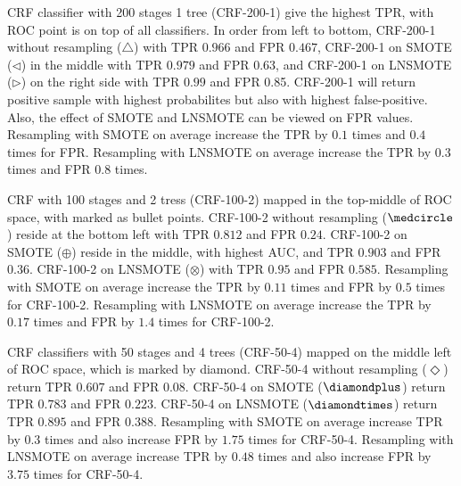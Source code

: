 CRF classifier with 200 stages 1 tree (CRF-200-1) give the highest TPR, with
ROC point is on top of all classifiers.
In order from left to bottom, CRF-200-1 without resampling ($\triangle$) with
TPR $0.966$ and FPR $0.467$, CRF-200-1 on SMOTE ($\triangleleft$) in the middle
with TPR $0.979$ and FPR $0.63$, and CRF-200-1 on LNSMOTE ($\triangleright$) on
the right side with TPR $0.99$ and FPR 0.85.
CRF-200-1 will return positive sample with highest probabilites but also with
highest false-positive.
Also, the effect of SMOTE and LNSMOTE can be viewed on FPR values.
Resampling with SMOTE on average increase the TPR by $0.1$ times and $0.4$
times for FPR.
Resampling with LNSMOTE on average increase the TPR by $0.3$ times and FPR
$0.8$ times.

CRF with 100 stages and 2 tress (CRF-100-2) mapped in the top-middle of ROC
space, with marked as bullet points.
CRF-100-2 without resampling ($\medcircle$) reside at the bottom left with TPR
$0.812$ and FPR $0.24$.
CRF-100-2 on SMOTE ($\oplus$) reside in the middle, with highest AUC, and TPR
$0.903$ and FPR $0.36$.
CRF-100-2 on LNSMOTE ($\otimes$) with TPR $0.95$ and FPR $0.585$.
Resampling with SMOTE on average increase the TPR by $0.11$ times and FPR by
$0.5$ times for CRF-100-2.
Resampling with LNSMOTE on average increase the TPR by $0.17$ times and FPR by
$1.4$ times for CRF-100-2.

CRF classifiers with 50 stages and 4 trees (CRF-50-4) mapped on the middle left
of ROC space, which is marked by diamond.
CRF-50-4 without resampling ($\Diamond$) return TPR $0.607$ and FPR $0.08$.
CRF-50-4 on SMOTE ($\diamondplus$) return TPR $0.783$ and FPR $0.223$.
CRF-50-4 on LNSMOTE ($\diamondtimes$) return TPR $0.895$ and FPR $0.388$.
Resampling with SMOTE on average increase TPR by $0.3$ times and also increase
FPR by $1.75$ times for CRF-50-4.
Resampling with LNSMOTE on average increase TPR by $0.48$ times and also
increase FPR by $3.75$ times for CRF-50-4.
